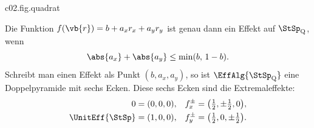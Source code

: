 \begin{tpcfigure}{c02.fig.quadrat}
  \caption{Das Quadrat-Bit. (a) Die Mitte des Quadrats liegt auf beiden Diagonalen; sie
    ist die Mitte zwischen $s_{00}$ und $s_{11}$ und ebenso die Mitte zwischen $s_{10}$
    und $s_{01}$, wie in Gleichung~\eqref{c02.eq.quadrat-mitte}. (b) Die Niveaulinien des
    Extremaleffekts $f_x^{+}$ aus Proposition~\ref{c02.prop.quadrat}: Er hat auf der
    rechten Kante den Wert $1$ und auf der linken den Wert $0$.}
\end{tpcfigure}

\begin{proposition}\label{c02.prop.quadrat}
  Die Funktion $f(\vb{r}) = b + a_x r_x + a_y r_y$ ist genau dann ein Effekt auf
  $\StSp_{\mathrm{Q}}$, wenn
  \begin{equation}\label{c02.eq.quadrat-effekt}
    \abs{a_x} + \abs{a_y} \leq \min(b,\, 1-b) .
  \end{equation}
  Schreibt man einen Effekt als Punkt $(b, a_x, a_y)$, so ist
  $\EffAlg{\StSp_{\mathrm{Q}}}$ eine Doppelpyramide mit sechs Ecken. Diese sechs Ecken sind
  die Extremaleffekte:
  \begin{equation}\label{c02.eq.quadrat-extremal}
    \begin{aligned}
      0 &= (0,0,0), & f_x^{\pm} &= \bigl(\tfrac12, \pm\tfrac12, 0\bigr), \\
      \UnitEff{\StSp} &= (1,0,0), & f_y^{\pm} &= \bigl(\tfrac12, 0, \pm\tfrac12\bigr) .
    \end{aligned}
  \end{equation}
\end{proposition}
